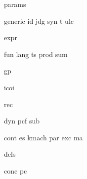 {params}

{generic}
{id}
{jdg}
{syn}
{t}
{ulc}

{expr}

{fun}
{lang}
{ts}
{prod}
{sum}

{gp}

{icoi}

{rec}

{dyn}
{pcf}
{sub}

{cont}
{es}
{kmach}
{par}
{exc}
{ma}

{dcls}

{conc}
{pc}
